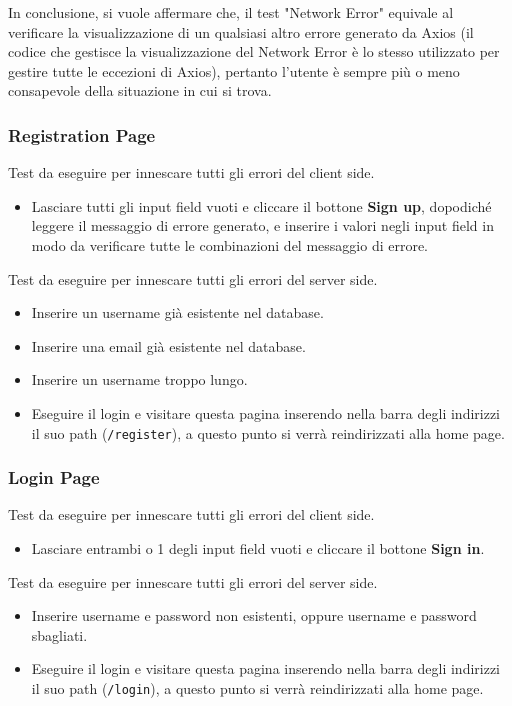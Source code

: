 In conclusione, si vuole affermare che, il test "Network Error" equivale al verificare la visualizzazione di un qualsiasi altro errore generato da Axios (il codice che gestisce la visualizzazione del Network Error è lo stesso utilizzato per gestire tutte le eccezioni di Axios), pertanto l'utente è sempre più o meno consapevole della situazione in cui si trova.

\newpage

\subsubsection{Registration Page}

Test da eseguire per innescare tutti gli errori del client side.
\begin{itemize}
\item
	Lasciare tutti gli input field vuoti e cliccare il bottone \textbf{Sign up}, dopodiché leggere il messaggio di errore generato, e inserire i valori negli input field in modo da verificare tutte le combinazioni del messaggio di errore.
\end{itemize}

\removeHorizontalSpaceBig Test da eseguire per innescare tutti gli errori del server side.
\begin{itemize}
\item
	Inserire un username già esistente nel database.
\item
	Inserire una email già esistente nel database.
\item
	Inserire un username troppo lungo.
\item
	Eseguire il login e visitare questa pagina inserendo nella barra degli indirizzi il suo path (\texttt{/register}), a questo punto si verrà reindirizzati alla home page.
\end{itemize}

\subsubsection{Login Page}

Test da eseguire per innescare tutti gli errori del client side.
\begin{itemize}
\item
	Lasciare entrambi o 1 degli input field vuoti e cliccare il bottone \textbf{Sign in}.
\end{itemize}

\removeHorizontalSpaceBig Test da eseguire per innescare tutti gli errori del server side.
\begin{itemize}
\item
	Inserire username e password non esistenti, oppure username e password sbagliati.
\item
	Eseguire il login e visitare questa pagina inserendo nella barra degli indirizzi il suo path (\texttt{/login}), a questo punto si verrà reindirizzati alla home page.
\end{itemize}


